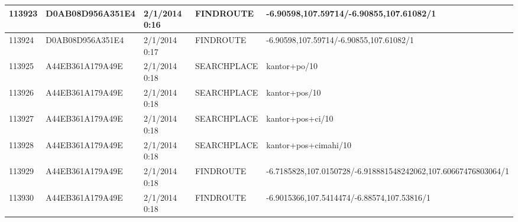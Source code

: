 \begin{longtable}{|p{1cm}|l|l|l|p{8cm}|}
113923         & D0AB08D956A351E4 & 2/1/2014 0:16            & FINDROUTE       & -6.90598,107.59714/-6.90855,107.61082/1                                                                                                                                                                               \\ \hline
113924         & D0AB08D956A351E4 & 2/1/2014 0:17            & FINDROUTE       & -6.90598,107.59714/-6.90855,107.61082/1                                                                                                                                                                               \\ \hline
113925         & A44EB361A179A49E & 2/1/2014 0:18            & SEARCHPLACE     & kantor+po/10                                                                                                                                                                                                          \\ \hline
113926         & A44EB361A179A49E & 2/1/2014 0:18            & SEARCHPLACE     & kantor+pos/10                                                                                                                                                                                                         \\ \hline
113927         & A44EB361A179A49E & 2/1/2014 0:18            & SEARCHPLACE     & kantor+pos+ci/10                                                                                                                                                                                                      \\ \hline
113928         & A44EB361A179A49E & 2/1/2014 0:18            & SEARCHPLACE     & kantor+pos+cimahi/10                                                                                                                                                                                                  \\ \hline
113929         & A44EB361A179A49E & 2/1/2014 0:18            & FINDROUTE       & -6.7185828,107.0150728/-6.918881548242062,107.60667476803064/1                                                                                                                                                        \\ \hline
113930         & A44EB361A179A49E & 2/1/2014 0:18            & FINDROUTE       & -6.9015366,107.5414474/-6.88574,107.53816/1                                                                                                                                                                           \\ \hline

\end{longtable}
